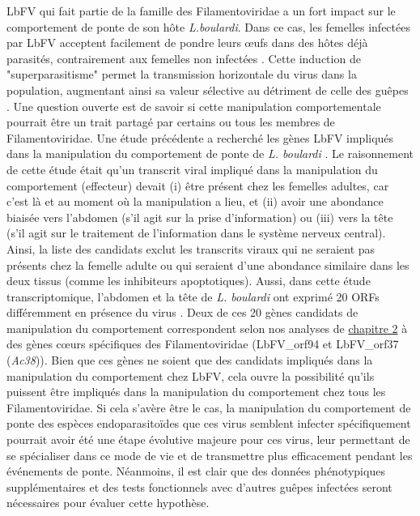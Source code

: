 LbFV qui fait partie de la famille des Filamentoviridae a un fort impact sur le comportement de ponte de son hôte \textit{L.boulardi}. Dans ce cas, les femelles infectées par LbFV acceptent facilement de pondre leurs œufs dans des hôtes déjà parasités, contrairement aux femelles non infectées \citep{varaldi_infectious_2003,varaldi_artifical_2006}. Cette induction de "superparasitisme" permet la transmission horizontale du virus dans la population, augmentant ainsi sa valeur sélective au détriment de celle des guêpes \citep{gandon_superparasitism_2006}. Une question ouverte est de savoir si cette manipulation comportementale pourrait être un trait partagé par certains ou tous les membres de Filamentoviridae. Une étude précédente a recherché les gènes LbFV impliqués dans la manipulation du comportement de ponte de \textit{L. boulardi} \citep{varaldi_deciphering_2018}. Le raisonnement de cette étude était qu'un transcrit viral impliqué dans la manipulation du comportement (effecteur) devait (i) être présent chez les femelles adultes, car c'est là et au moment où la manipulation a lieu, et (ii) avoir une abondance biaisée vers l'abdomen (s'il agit sur la prise d'information) ou (iii) vers la tête (s'il agit sur le traitement de l'information dans le système nerveux central). 
Ainsi, la liste des candidats exclut les transcrits viraux qui ne seraient pas présents chez la femelle adulte ou qui seraient d'une abondance similaire dans les deux tissus (comme les inhibiteurs apoptotiques). Aussi, dans cette étude transcriptomique, l'abdomen et la tête de \textit{L. boulardi} ont exprimé 20 ORFs différemment en présence du virus \citep{varaldi_deciphering_2018}. Deux de ces 20 gènes candidats de manipulation du comportement correspondent selon nos analyses de \hyperref[sec:chap2]{chapitre 2} à des gènes cœurs spécifiques des Filamentoviridae (LbFV\_orf94 et LbFV\_orf37 (\textit{Ac38})). Bien que ces gènes ne soient que des candidats impliqués dans la manipulation du comportement chez LbFV, cela ouvre la possibilité qu'ils puissent être impliqués dans la manipulation du comportement chez tous les Filamentoviridae. Si cela s'avère être le cas, la manipulation du comportement de ponte des espèces endoparasitoïdes que ces virus semblent infecter spécifiquement pourrait avoir été une étape évolutive majeure pour ces virus, leur permettant de se spécialiser dans ce mode de vie et de transmettre plus efficacement pendant les événements de ponte. Néanmoins, il est clair que des données phénotypiques supplémentaires et des tests fonctionnels avec d'autres guêpes infectées seront nécessaires pour évaluer cette hypothèse. 

